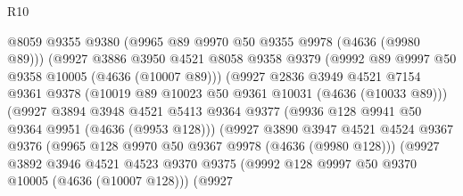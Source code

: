 \begin{lexlean}{R10}
\begin{coremodule}
                                  @8059
                                  @9355
                                  @9380
                                  (@9965 @89 @9970 @50 @9355 @9978 (@4636 (@9980 @89)))
                                  (@9927
                                    @3886
                                    @3950
                                    @4521
                                    @8058
                                    @9358
                                    @9379
                                    (@9992 @89 @9997 @50 @9358 @10005 (@4636 (@10007 @89)))
                                    (@9927
                                      @2836
                                      @3949
                                      @4521
                                      @7154
                                      @9361
                                      @9378
                                      (@10019 @89 @10023 @50 @9361 @10031 (@4636 (@10033 @89)))
                                      (@9927
                                        @3894
                                        @3948
                                        @4521
                                        @5413
                                        @9364
                                        @9377
                                        (@9936 @128 @9941 @50 @9364 @9951 (@4636 (@9953 @128)))
                                        (@9927
                                          @3890
                                          @3947
                                          @4521
                                          @4524
                                          @9367
                                          @9376
                                          (@9965 @128 @9970 @50 @9367 @9978 (@4636 (@9980 @128)))
                                          (@9927
                                            @3892
                                            @3946
                                            @4521
                                            @4523
                                            @9370
                                            @9375
                                            (@9992
                                              @128
                                              @9997
                                              @50
                                              @9370
                                              @10005
                                              (@4636 (@10007 @128)))
                                            (@9927

\end{coremodule}
\end{lexlean}
